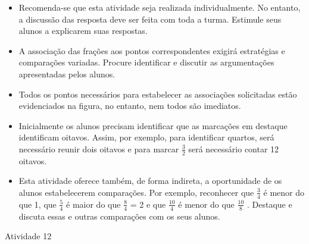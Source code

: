 \begin{multicols}{2}
\begin{itemize}  
     \item  Recomenda-se que esta atividade seja realizada individualmente. No entanto, a discussão das resposta deve ser feita com toda a turma. Estimule seus alunos a explicarem suas respostas.  
     \item  A associação das frações aos pontos correspondentes exigirá estratégias e comparações variadas. Procure identificar e discutir as argumentações apresentadas pelos alunos.   
     \item  Todos os pontos necessários para estabelecer as associações solicitadas estão evidenciados na figura, no entanto, nem todos são imediatos.  
     \item  Inicialmente os alunos precisam identificar que as marcações em destaque identificam oitavos. Assim, por exemplo, para identificar quartos, será necessário reunir dois oitavos e para marcar   $\frac{3}{2}$   será necessário contar 12 oitavos.  
     \item  Esta atividade oferece também, de forma indireta, a oportunidade de os alunos estabelecerem comparações. Por exemplo, reconhecer que   $\frac{3}{4}$   é menor do que 1, que   $\frac{5}{4}$   é maior do que   $\frac{8}{4}$   = 2 e que   $\frac{10}{4}$   é menor do que   $\frac{10}{8}$  . Destaque e discuta essas e outras comparações com os seus alunos.   
\end{itemize}      
 
\begin{resposta*}{Atividade 12}
\noindent
{}
\end{resposta*}
\end{multicols}
